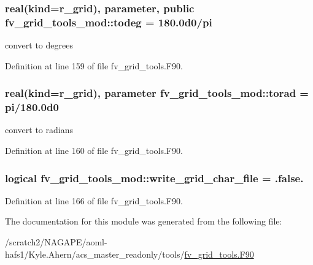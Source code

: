 \subsubsection[{todeg}]{\setlength{\rightskip}{0pt plus 5cm}real(kind=r\-\_\-grid), parameter, public fv\-\_\-grid\-\_\-tools\-\_\-mod\-::todeg = 180.\-0d0/pi}\label{classfv__grid__tools__mod_a8b3bcc75f621d290a7cfa0b736983e3f}


convert to degrees 



Definition at line 159 of file fv\-\_\-grid\-\_\-tools.\-F90.

\subsubsection[{torad}]{\setlength{\rightskip}{0pt plus 5cm}real(kind=r\-\_\-grid), parameter fv\-\_\-grid\-\_\-tools\-\_\-mod\-::torad = pi/180.\-0d0\hspace{0.3cm}{\ttfamily [private]}}\label{classfv__grid__tools__mod_a532808a493ee0706dd78a3383537ad9a}


convert to radians 



Definition at line 160 of file fv\-\_\-grid\-\_\-tools.\-F90.

\subsubsection[{write\-\_\-grid\-\_\-char\-\_\-file}]{\setlength{\rightskip}{0pt plus 5cm}logical fv\-\_\-grid\-\_\-tools\-\_\-mod\-::write\-\_\-grid\-\_\-char\-\_\-file = .false.\hspace{0.3cm}{\ttfamily [private]}}\label{classfv__grid__tools__mod_ab05dbcee57bb7bce7cb38d1b50f8aa69}


Definition at line 166 of file fv\-\_\-grid\-\_\-tools.\-F90.



The documentation for this module was generated from the following file\-:\begin{DoxyCompactItemize}
\item 
/scratch2/\-N\-A\-G\-A\-P\-E/aoml-\/hafs1/\-Kyle.\-Ahern/acs\-\_\-master\-\_\-readonly/tools/\hyperlink{fv__grid__tools_8F90}{fv\-\_\-grid\-\_\-tools.\-F90}\end{DoxyCompactItemize}
